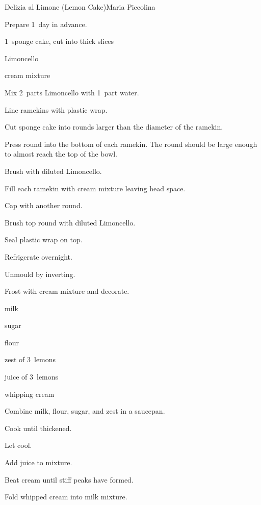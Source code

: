 \begin{recipe}{Delizia al Limone (Lemon Cake)}{Maria Piccolina}{}

Prepare 1~day in advance.

\begin{ingredients}
\item 1~sponge cake, cut into  thick slices
\item Limoncello
\item cream mixture
\end{ingredients}

\begin{directions}
\item Mix 2~parts Limoncello with 1~part water.
\item Line ramekins with plastic wrap.
\item Cut sponge cake into rounds larger than the diameter of the ramekin.
\item Press round into the bottom of each ramekin. The round should be large enough to almost reach the top of the bowl.
\item Brush with diluted Limoncello.
\item Fill each ramekin with cream mixture leaving  head space.
\item Cap with another round.
\item Brush top round with diluted Limoncello.
\item Seal plastic wrap on top.
\item Refrigerate overnight.
\item Unmould by inverting.
\item Frost with cream mixture and decorate.
\end{directions}



\begin{ingredients}
\item {} milk
\item {} sugar
\item {} flour
\item zest of 3~lemons
\item juice of 3~lemons
\item {} whipping cream
\end{ingredients}

\begin{directions}
\item Combine milk, flour, sugar, and zest in a saucepan.
\item Cook until thickened.
\item Let cool.
\item Add juice to mixture.
\item Beat cream until stiff peaks have formed.
\item Fold whipped cream into milk mixture.
\end{directions}
\end{recipe}

